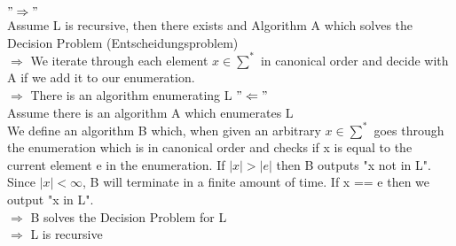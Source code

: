\documentclass[8pt]{extreport}
\begin{document}
\begin{enumerate}
$"\Rightarrow"$\\
Assume L is recursive, then there exists and Algorithm A which solves the Decision Problem (Entscheidungsproblem)\\
$\Rightarrow$ We iterate through each element $x \in \sum^*$ in canonical order and decide with A if we add it to our enumeration.\\
$\Rightarrow$ There is an algorithm enumerating L
\newline
$"\Leftarrow"$\\
Assume there is an algorithm A which enumerates L\\
We define an algorithm B which, when given an arbitrary $x \in \sum^*$ goes through the enumeration which is in canonical order and checks if x is equal to the current element e in the enumeration. If $|x| > |e|$ then B outputs "x not in L". Since $|x| < \infty$, B will terminate in a finite amount of time. If x == e then we output "x in L".\\
$\Rightarrow$ B solves the Decision Problem for L\\
$\Rightarrow$ L is recursive
\end{enumerate}
\end{document}
